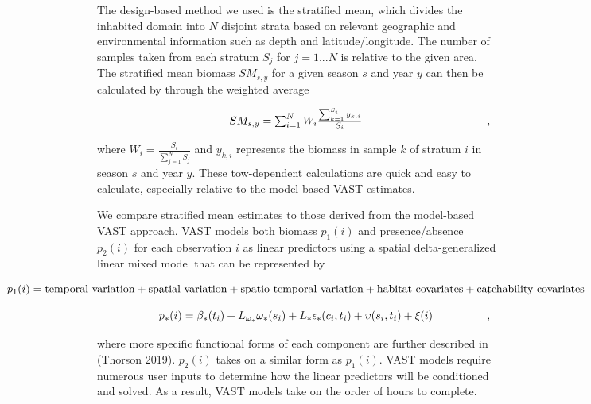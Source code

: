 \documentclass[
  12pt,
]{article}
\begin{document}
The design-based method we used is the stratified mean, which divides the inhabited domain into \(N\) disjoint strata based on relevant geographic and environmental information such as depth and latitude/longitude. The number of samples taken from each stratum \(S_j\) for \(j=1...N\) is relative to the given area. The stratified mean biomass \(SM_{s,y}\) for a given season \(s\) and year \(y\) can then be calculated by through the weighted average

\[
  \makebox[\linewidth]{$SM_{s,y} = \sum_{i=1}^N W_i \frac{\sum_{k=1}^{S_i}y_{k,i}}{S_i}$},
\]

where \(W_i=\frac{S_i}{\sum_{j=1}^N S_j}\) and \(y_{k,i}\) represents the biomass in sample \(k\) of stratum \(i\) in season \(s\) and year \(y\). These tow-dependent calculations are quick and easy to calculate, especially relative to the model-based VAST estimates.

We compare stratified mean estimates to those derived from the model-based VAST approach. VAST models both biomass \(p_1(i)\) and presence/absence \(p_2(i)\) for each observation \(i\) as linear predictors using a spatial delta-generalized linear mixed model that can be represented by

\[
  \makebox[\linewidth]{$p_1(i)=\text{temporal variation} + \text{spatial variation} + \text{spatio-temporal variation}  + \text{habitat covariates} + \text{catchability covariates}$},
\]

\[
  \makebox[\linewidth]{$p_*(i)= \beta_*(t_i) + L_{\omega_*}\omega_*(s_i) + L_* \epsilon_*(c_i,t_i) + \upsilon(s_i,t_i) + \xi(i)$},
\]

where more specific functional forms of each component are further described in (Thorson 2019). \(p_2(i)\) takes on a similar form as \(p_1(i)\). VAST models require numerous user inputs to determine how the linear predictors will be conditioned and solved. As a result, VAST models take on the order of hours to complete.
\end{document}
